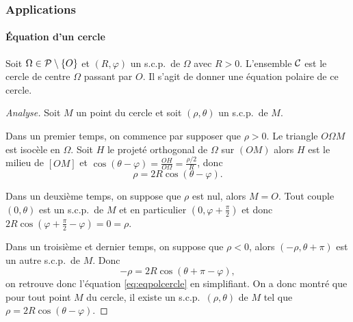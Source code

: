 \subsubsection{Applications}
\label{subsubsec:applicationeqcartetpol}

\paragraph{Équation d'un cercle}
\label{par:eqcercle}

Soit \(\Omega \in \P \setminus\{O\}\) et \((R , \varphi)\) un s.c.p.\ de
\(\Omega\) avec \(R>0\). L'ensemble \(\courbe\) est le cercle de centre
\(\Omega\) passant par \(O\). Il s'agit de donner une équation polaire de ce
cercle.

\begin{proof}[Analyse]
  Soit \(M\) un point du cercle et soit \((\rho, \theta)\) un s.c.p.\ de \(M\).

  Dans un premier temps, on commence par supposer que \(\rho >0\). Le triangle
  \(O\Omega M\) est isocèle en \(\Omega\). Soit \(H\) le projeté orthogonal de
  \(\Omega\) sur \((OM)\) alors \(H\) est le milieu de \([OM]\) et \(\cos(\theta
  - \varphi) = \frac{OH}{O\Omega} = \frac{\rho/2}{R}\), donc
  \begin{equation}
    \label{eq:eqpolcercle}
    \rho = 2R \cos(\theta - \varphi).
  \end{equation}

  Dans un deuxième temps, on suppose que \(\rho\) est nul, alors \(M = O\).
  Tout couple \((0 , \theta)\) est un s.c.p.\ de \(M\) et en particulier \((0 ,
  \varphi + \frac{\pi}{2})\) et donc \(2R \cos(\varphi + \frac{\pi}{2} -
  \varphi) = 0 = \rho\).

  Dans un troisième et dernier temps, on suppose que \(\rho <0\), alors
  \((-\rho, \theta + \pi)\) est un autre s.c.p.\ de \(M\). Donc
  \begin{equation}
    -\rho = 2R \cos(\theta + \pi - \varphi),
  \end{equation}
  on retrouve donc l'équation \eqref{eq:eqpolcercle} en simplifiant. On a donc
  montré que pour tout point \(M\) du cercle, il existe un s.c.p.\ \((\rho ,
  \theta)\) de \(M\) tel que \(\rho = 2R\cos(\theta - \varphi)\).
\end{proof}

